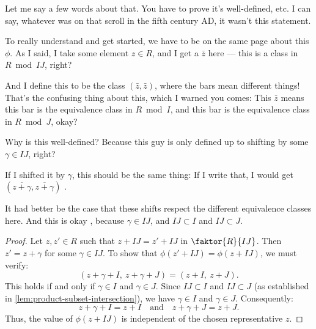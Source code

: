 \begin{speech}[01:21:59 - 01:24:09]
Let me say a few words about that. You have to prove it's well-defined, etc. I can say, whatever was on that scroll in the fifth century AD, it wasn't this statement. 

To really understand and get started, we have to be on the same page about this $\phi$. As I said, I take some element $z \in R$, and I get a $\bar{z}$ here --- this is a class in $R \bmod IJ$, right? 

And I define this to be the class $(\bar{z}, \bar{z})$, where the bars mean different things! That's the confusing thing about this, which I warned you comes: This $\bar{z}$ means this bar is the equivalence class in $R \bmod I$, and this bar is the equivalence class in $R \bmod J$, okay?

Why is this well-defined? Because this guy is only defined up to shifting by some $\gamma \in IJ$, right? 

If I shifted it by $\gamma$, this should be the same thing: If I write that, I would get $(\overline{z + \gamma}, \overline{z + \gamma})$ .

It had better be the case that these shifts respect the different equivalence classes here. And this is okay , because $\gamma \in IJ$, and $IJ \subset I$ and $IJ \subset J$.
\end{speech}

\begin{content}

\begin{proof}
Let $z, z' \in R$ such that $z + IJ = z' + IJ$ in $\faktor{R}{IJ}$.
Then $z' = z + \gamma$ for some $\gamma \in IJ$.
To show that $\phi(z' + IJ) = \phi(z + IJ)$, we must verify:
\[
(z + \gamma + I, \ z + \gamma + J) = (z + I, \ z + J).
\]
This holds if and only if $\gamma \in I$ and $\gamma \in J$.
Since $IJ \subset I$ and $IJ \subset J$ (as established in \cref{lem:product-subset-intersection}), we have $\gamma \in I$ and $\gamma \in J$.
Consequently:
\[
z + \gamma + I = z + I \quad \text{and} \quad z + \gamma + J = z + J.
\]
Thus, the value of $\phi(z + IJ)$ is independent of the chosen representative $z$.
\end{proof}
\end{content}

